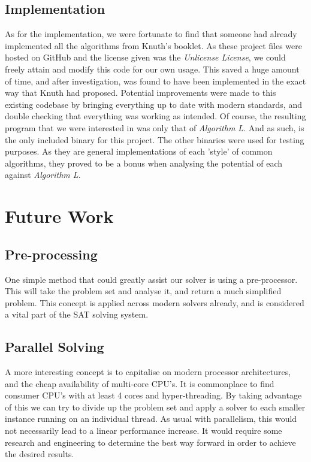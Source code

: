 \documentclass{article}
\begin{document}
\subsection{Implementation}
As for the implementation, we were fortunate to find that someone had already implemented all the algorithms from Knuth's booklet.
As these project files were hosted on GitHub\cite{aaw} and the license given was the \textit{Unlicense License}, we could freely
attain and modify this code for our own usage. This saved a huge amount of time, and after investigation, was found to have been
implemented in the exact way that Knuth had proposed. Potential improvements were made to this existing codebase by bringing
everything up to date with modern standards, and double checking that everything was working as intended. Of course, the resulting
program that we were interested in was only that of \textit{Algorithm L}. And as such, is the only included binary for this
project. The other binaries were used for testing purposes. As they are general implementations of each 'style' of common
algorithms, they proved to be a bonus when analysing the potential of each against \textit{Algorithm L}.

\section{Future Work}

\subsection{Pre-processing}
One simple method that could greatly assist our solver is using a pre-processor. This will take the problem set and analyse it,
and return a much simplified problem. This concept is applied across modern solvers already, and is considered a vital part of
the SAT solving system.


\subsection{Parallel Solving}
A more interesting concept is to capitalise on modern processor architectures, and the cheap availability of multi-core CPU's. It
is commonplace to find consumer CPU's with at least 4 cores and hyper-threading. By taking advantage of this we can try to divide
up the problem set and apply a solver to each smaller instance running on an individual thread. As usual with parallelism, this
would not necessarily lead to a linear performance increase. It would require some research and engineering to determine the best
way forward in order to achieve the desired results.
\end{document}
